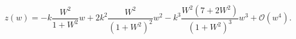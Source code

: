\begin{equation}\label{eq:zofw}
z(w) = -k \frac{W^2}{1+W^2} w+2 k^2 \frac{W^2}{(1+W^2)^2} w^2
-k^3 \frac{W^2(7+2 W^2)}{(1+W^2)^3} w^3+\mathcal{O}(w^4).
\end{equation}

